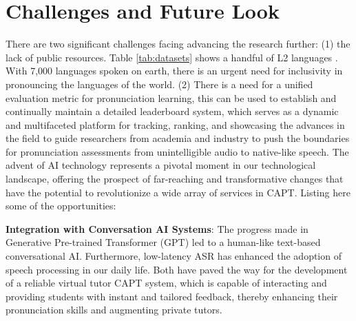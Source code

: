 \documentclass[11pt]{article}
\begin{document}



\section{Challenges and Future Look}
There are two significant challenges facing advancing the research further: (1) the lack of public resources. Table \ref{tab:datasets} shows a handful of L2 languages%
. With 7,000 languages spoken on earth, there is an urgent need for inclusivity in pronouncing the languages of the world. (2) There is a need for a unified evaluation metric for pronunciation learning, this can be used to establish and continually maintain a detailed leaderboard system, which serves as a dynamic and multifaceted platform for tracking, ranking, and showcasing the advances in the field to guide researchers from academia and industry to push the boundaries for pronunciation assessments from unintelligible audio to native-like speech. %
The advent of AI technology represents a pivotal moment in our technological landscape, offering the prospect of far-reaching and transformative changes that have the potential to revolutionize a wide array of services in CAPT. Listing here some of the opportunities:

\textbf{Integration with Conversation AI Systems}: The progress made in Generative Pre-trained Transformer (GPT) led to a human-like text-based conversational AI. Furthermore, low-latency ASR has enhanced the adoption of speech processing in our daily life. Both have paved the way for the development of a reliable virtual tutor CAPT system, which is capable of interacting and providing students with instant and tailored feedback, thereby enhancing their pronunciation skills and augmenting private tutors.
\end{document}
